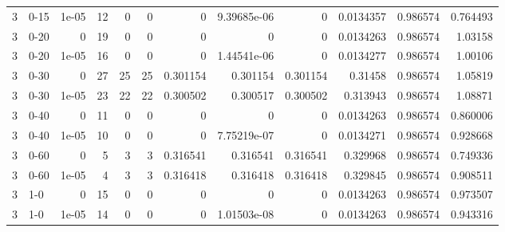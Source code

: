 \begin{tabular}{rlrrrrrrrrrr}
     3 & 0-15   &      1e-05 &          12 &                 0 &                 0 &     0           &     9.39685e-06 &      0           &        0.0134357 &               0.986574 &           0.764493 \\
     3 & 0-20   &      0     &          19 &                 0 &                 0 &     0           &     0           &      0           &        0.0134263 &               0.986574 &           1.03158  \\
     3 & 0-20   &      1e-05 &          16 &                 0 &                 0 &     0           &     1.44541e-06 &      0           &        0.0134277 &               0.986574 &           1.00106  \\
     3 & 0-30   &      0     &          27 &                25 &                25 &     0.301154    &     0.301154    &      0.301154    &        0.31458   &               0.986574 &           1.05819  \\
     3 & 0-30   &      1e-05 &          23 &                22 &                22 &     0.300502    &     0.300517    &      0.300502    &        0.313943  &               0.986574 &           1.08871  \\
     3 & 0-40   &      0     &          11 &                 0 &                 0 &     0           &     0           &      0           &        0.0134263 &               0.986574 &           0.860006 \\
     3 & 0-40   &      1e-05 &          10 &                 0 &                 0 &     0           &     7.75219e-07 &      0           &        0.0134271 &               0.986574 &           0.928668 \\
     3 & 0-60   &      0     &           5 &                 3 &                 3 &     0.316541    &     0.316541    &      0.316541    &        0.329968  &               0.986574 &           0.749336 \\
     3 & 0-60   &      1e-05 &           4 &                 3 &                 3 &     0.316418    &     0.316418    &      0.316418    &        0.329845  &               0.986574 &           0.908511 \\
     3 & 1-0    &      0     &          15 &                 0 &                 0 &     0           &     0           &      0           &        0.0134263 &               0.986574 &           0.973507 \\
     3 & 1-0    &      1e-05 &          14 &                 0 &                 0 &     0           &     1.01503e-08 &      0           &        0.0134263 &               0.986574 &           0.943316 \\

\end{tabular}
